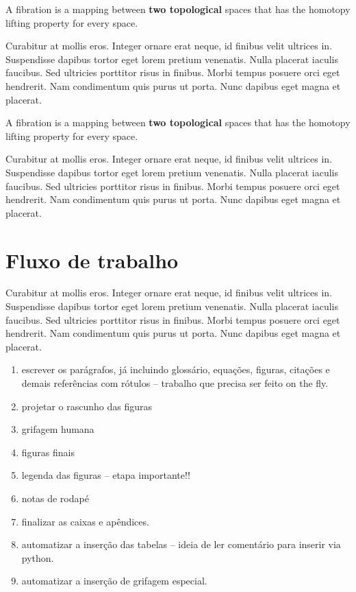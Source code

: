 \documentclass[./main.tex]{subfiles}
\begin{document}
\begin{assumption}[Scale]
    A fibration is a mapping between \textbf{two topological} spaces that has the homotopy lifting property for every space.
\end{assumption}

\par Curabitur at mollis eros. Integer ornare erat neque, id finibus velit ultrices in. Suspendisse dapibus tortor eget lorem pretium venenatis. Nulla placerat iaculis faucibus. Sed ultricies porttitor risus in finibus. Morbi tempus posuere orci eget hendrerit. Nam condimentum quis purus ut porta. Nunc dapibus eget magna et placerat.

\begin{definition}[Simplicity]
    A fibration is a mapping between \textbf{two topological} spaces that has the homotopy lifting property for every space.
\end{definition}

\par Curabitur at mollis eros. Integer ornare erat neque, id finibus velit ultrices in. Suspendisse dapibus tortor eget lorem pretium venenatis. Nulla placerat iaculis faucibus. Sed ultricies porttitor risus in finibus. Morbi tempus posuere orci eget hendrerit. Nam condimentum quis purus ut porta. Nunc dapibus eget magna et placerat.

\section{Fluxo de trabalho}

\par Curabitur at mollis eros. Integer ornare erat neque, id finibus velit ultrices in. Suspendisse dapibus tortor eget lorem pretium venenatis. Nulla placerat iaculis faucibus. Sed ultricies porttitor risus in finibus. Morbi tempus posuere orci eget hendrerit. Nam condimentum quis purus ut porta. Nunc dapibus eget magna et placerat.

\begin{enumerate}
    \item escrever os parágrafos, já incluindo glossário, equações, figuras, citações e demais referências com rótulos -- trabalho que precisa ser feito on the fly.
    \item projetar o rascunho das figuras
    \item grifagem humana
    \item figuras finais
    \item legenda das figuras -- etapa importante!!
    \item notas de rodapé
    \item finalizar as caixas e apêndices.
    \item automatizar a inserção das tabelas -- ideia de ler comentário para inserir via python.
    \item automatizar a inserção de grifagem especial.
\end{enumerate}
\end{document}

